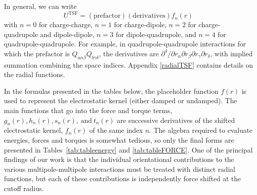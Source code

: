 In general, we can write
%
\begin{equation}
U^{\text{TSF}}= (\text{prefactor}) (\text{derivatives}) f_n(r)
\label{generic}
\end{equation}
%
with $n=0$ for charge-charge, $n=1$ for charge-dipole, $n=2$ for
charge-quadrupole and dipole-dipole, $n=3$ for dipole-quadrupole, and
$n=4$ for quadrupole-quadrupole.  For example, in
quadrupole-quadrupole interactions for which the $\text{prefactor}$ is
$Q_{a \alpha\beta}Q_{b \gamma\delta}$, the derivatives are
$\partial^4/\partial r_\alpha \partial r_\beta \partial
r_\gamma \partial r_\delta$, with implied summation combining the
space indices.  Appendix \ref{radialTSF} contains details on the
radial functions.

In the formulas presented in the tables below, the placeholder
function $f(r)$ is used to represent the electrostatic kernel (either
damped or undamped).  The main functions that go into the force and
torque terms, $g_n(r), h_n(r), s_n(r), \mathrm{~and~} t_n(r)$ are
successive derivatives of the shifted electrostatic kernel, $f_n(r)$
of the same index $n$.  The algebra required to evaluate energies,
forces and torques is somewhat tedious, so only the final forms are
presented in Tables~\ref{tab:tableenergy} and \ref{tab:tableFORCE}.
One of the principal findings of our work is that the individual
orientational contributions to the various multipole-multipole
interactions must be treated with distinct radial functions, but each
of these contributions is independently force shifted at the cutoff
radius.  
